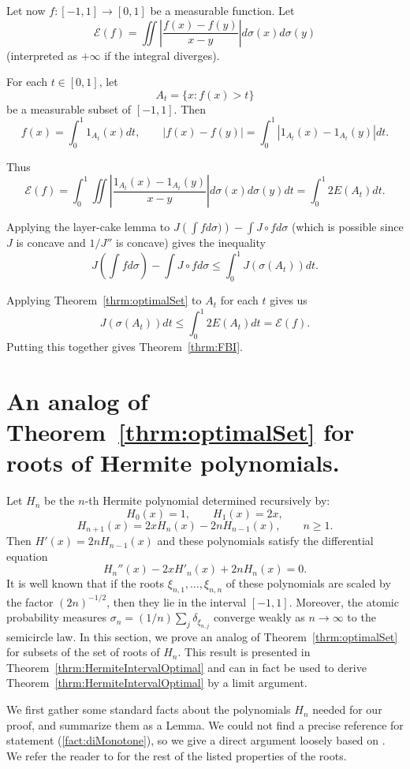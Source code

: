 Let now $f:[-1,1]\to[0,1]$ be a measurable function. 
Let $$\mathscr{E}(f) = \iint \left|\frac{f(x)-f(y)}{x-y}\right| d\sigma(x) d\sigma(y)$$ (interpreted as $+\infty$ if the integral diverges). 

For each $t\in [0,1]$, let $$A_t = \{x : f(x)> t\} $$ be a measurable subset of $[-1,1]$.  Then 
$$
f(x) =\int_{0}^1 1_{A_t} (x) dt, \qquad |f(x)-f(y)|=\int_{0}^1 |1_{A_t} (x) - 1_{A_t} (y)| dt.
$$

Thus $$\mathscr{E}(f) = \int_{0}^1\iint  \left| \frac{1_{A_t} (x) - 1_{A_t} (y)}{x-y}\right| d\sigma(x)d\sigma(y) dt = 
\int_0^1 2E(A_t) dt.$$

Applying the layer-cake lemma to $J\left(\int fd\sigma)\right) - \int J\circ f d\sigma $ (which is possible since $J$ is concave and $1/J''$ is concave) gives the inequality
$$J\left(\int fd\sigma\right) - \int J\circ f d\sigma \leq \int_0^1 J(\sigma(A_t)) dt. $$

Applying Theorem~\ref{thrm:optimalSet} to $A_t$ for each $t$ gives us $$ J(\sigma(A_t)) dt  \leq \int_0^1 2E(A_t) dt = \mathscr{E}(f).$$ Putting this together gives Theorem~\ref{thrm:FBI}.


\section{An analog of Theorem~\ref{thrm:optimalSet} for roots of Hermite polynomials.}
Let $H_n$ be the $n$-th Hermite polynomial \cite[\S5.5]{Szego} determined recursively by:
$$H_0(x)=1,\qquad H_1(x) = 2x,$$
$$H_{n+1}(x) = 2x H_n(x) - 2n H_{n-1}(x),\qquad n\geq 1.$$
Then $H'(x) = 2n H_{n-1}(x)$ and these polynomials satisfy the differential equation $$
H_n''(x) - 2x H'_n(x) + 2nH_n(x) = 0.$$  It is well known \cite[\S3.3 and Chapter 5]{Szego} that if the roots $\xi_{n,1},\dots,\xi_{n,n}$ of these polynomials are scaled by the factor $(2n)^{-1/2}$, then they lie in the interval $[-1,1]$. Moreover, the atomic probability measures $\sigma_n = (1/n)\sum_j \delta_{\xi_{n,j}}$ converge weakly as $n\to\infty$ to the semicircle law. In this section, we prove an analog of Theorem~\ref{thrm:optimalSet} for subsets of the set of roots of $H_n$. This result is presented in Theorem~\ref{thrm:HermiteIntervalOptimal} and can in fact be used to derive Theorem~\ref{thrm:HermiteIntervalOptimal} by a limit argument.

We first gather some standard facts about the polynomials $H_n$ needed for our proof, and summarize them as a Lemma. We could not find a precise reference for statement (\ref{fact:diMonotone}), so we give a direct argument loosely based on \cite{IsmailMuldoon1991}.  We refer the reader to \cite[\S3.3, \S3.4]{Szego}  for the rest of the listed properties of the roots. 

